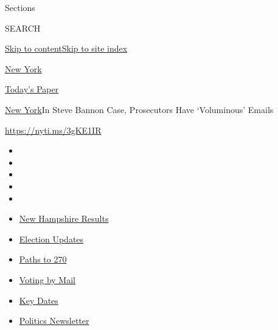 Sections

SEARCH

\protect\hyperlink{site-content}{Skip to
content}\protect\hyperlink{site-index}{Skip to site index}

\href{https://www.nytimes3xbfgragh.onion/section/nyregion}{New York}

\href{https://myaccount.nytimes3xbfgragh.onion/auth/login?response_type=cookie\&client_id=vi}{}

\href{https://www.nytimes3xbfgragh.onion/section/todayspaper}{Today's
Paper}

\href{/section/nyregion}{New York}\textbar{}In Steve Bannon Case,
Prosecutors Have `Voluminous' Emails

\url{https://nyti.ms/3gKE1IR}

\begin{itemize}
\item
\item
\item
\item
\item
\end{itemize}

\begin{itemize}
\item
  \href{https://www.nytimes3xbfgragh.onion/interactive/2020/09/08/us/elections/results-new-hampshire-primary-elections.html?action=click\&pgtype=Article\&state=default\&region=TOP_BANNER\&context=storylines_menu}{New
  Hampshire Results}
\item
  \href{https://www.nytimes3xbfgragh.onion/live/2020/09/08/us/trump-vs-biden?action=click\&pgtype=Article\&state=default\&region=TOP_BANNER\&context=storylines_menu}{Election
  Updates}
\item
  \href{https://www.nytimes3xbfgragh.onion/interactive/2020/us/elections/election-states-biden-trump.html?action=click\&pgtype=Article\&state=default\&region=TOP_BANNER\&context=storylines_menu}{Paths
  to 270}
\item
  \href{https://www.nytimes3xbfgragh.onion/interactive/2020/08/31/us/politics/vote-by-mail-deadlines.html?action=click\&pgtype=Article\&state=default\&region=TOP_BANNER\&context=storylines_menu}{Voting
  by Mail}
\item
  \href{https://www.nytimes3xbfgragh.onion/interactive/2019/us/elections/2020-presidential-election-calendar.html?action=click\&pgtype=Article\&state=default\&region=TOP_BANNER\&context=storylines_menu}{Key
  Dates}
\item
  \href{https://www.nytimes3xbfgragh.onion/newsletters/politics?action=click\&pgtype=Article\&state=default\&region=TOP_BANNER\&context=storylines_menu}{Politics
  Newsletter}
\end{itemize}

